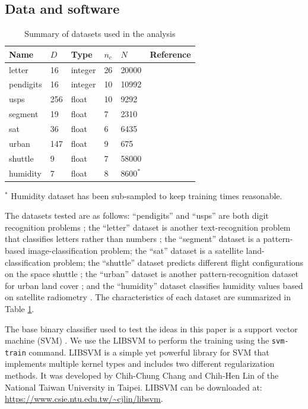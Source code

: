 \documentclass{article}
\begin{document}
\subsection{Data and software}

\begin{table}
	\caption{Summary of datasets used in the analysis}\label{datasets}
	\begin{tabular}{|l|lllll|}
	\hline
	Name & $D$ & Type & $n_c$ & $N$ & Reference \\\hline \hline
	letter &  16 & integer & 26 & 20000 & {\small \citep{Frey_Slate1991}}\\
	pendigits & 16 & integer & 10 & 10992 & {\small \citep{Alimoglu1996}}\\
	usps & 256 & float & 10 & 9292 & {\small \citep{Hull1994}}\\
	segment & 19 & float & 7 & 2310 & {\small \citep{King_etal1995}} \\
	sat & 36 & float & 6 & 6435 & {\small \citep{King_etal1995}}\\
	urban & 147 & float & 9 & 675 & {\small \citep{Johnson2013}} \\
	shuttle & 9 & float & 7 & 58000 & {\small \citep{King_etal1995}}\\
	humidity & 7 & float & 8 & 8600$^*$ & {\small \citep{Mills2009}} \\
	\hline
\end{tabular}
	\vspace{1 ex}

	\raggedright $^*$ Humidity dataset has been sub-sampled to keep training times reasonable.
\end{table}

The datasets tested are as follows: 
``pendigits'' and ``usps'' are both digit recognition problems 
\citep{Alimoglu1996, Hull1994};
the ``letter'' dataset is another text-recognition problem 
that classifies letters rather than numbers 
\citep{Frey_Slate1991};
the ``segment'' dataset is a pattern-based image-classification problem;
the ``sat'' dataset is a satellite land-classification problem;
the ``shuttle'' dataset predicts different flight configurations on the
space shuttle \citep{Michie_etal1994, King_etal1995};
the ``urban'' dataset is another pattern-recognition dataset for urban land cover
\citep{Johnson2013};
and the ``humidity'' dataset classifies humidity values based on satellite
radiometry \citep{Mills2009}.
The characteristics of each dataset are summarized in Table \ref{datasets}.

The base binary classifier used to test the ideas in this paper is a 
support vector machine (SVM) \citep{Mueller_etal2001}.
We use the LIBSVM \citep{Chang_Lin2011} to perform the training
using the \verb/svm-train/ command.
LIBSVM is a simple yet powerful library for SVM that implements multiple
kernel types and includes two different regularization methods.
It was developed by Chih-Chung Chang and Chih-Hen Lin of the National
Taiwan University in Taipei.
LIBSVM can be downloaded at: \url{https://www.csie.ntu.edu.tw/~cjlin/libsvm}.
\end{document}
